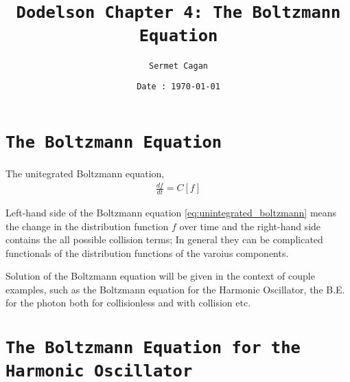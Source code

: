
\title{\texttt{Dodelson Chapter 4: The Boltzmann Equation}}
\author{\texttt{Sermet Cagan}}
\date{\texttt{Date : \today}}


\maketitle
\newpage

\section{\texttt{The Boltzmann Equation}}
The unitegrated Boltzmann equation,
\begin{align}
\label{eq:unintegrated_boltzmann}
\frac{df}{dt} = C\left[f\right]
\end{align}

Left-hand side of the Boltzmann equation \ref{eq:unintegrated_boltzmann} means the change in the distribution function $f$ over time and the right-hand side contains the all possible collision terms; In general they can be complicated functionals of the distribution functions of the varoius components.

Solution of the Boltzmann equation will be given in the context of couple examples, such as the Boltzmann equation for the Harmonic Oscillator, the B.E. for the photon both for collisionless and with collision etc.

\section{\texttt{The Boltzmann Equation for the Harmonic Oscillator}}


